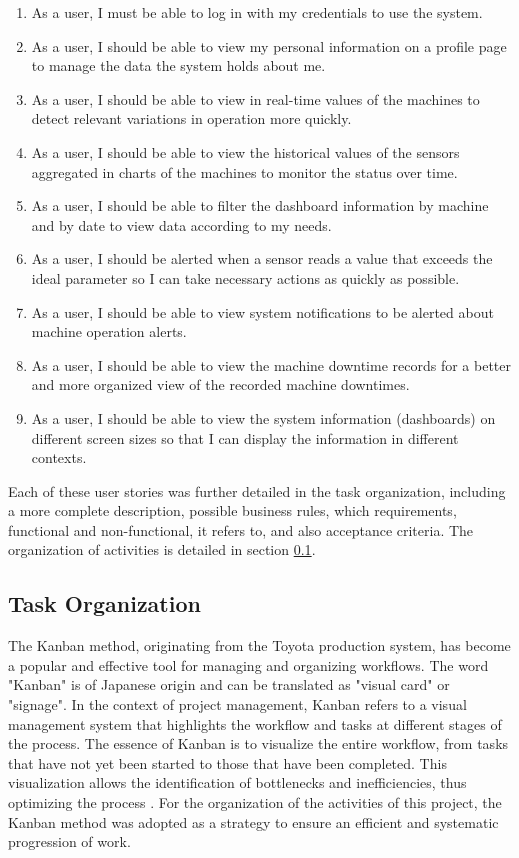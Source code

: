 \begin{enumerate}
    \item As a user, I must be able to log in with my credentials to use the system.
    \item As a user, I should be able to view my personal information on a profile page to manage the data the system holds about me.
    \item As a user, I should be able to view in real-time values of the machines to detect relevant variations in operation more quickly.
    \item As a user, I should be able to view the historical values of the sensors aggregated in charts of the machines to monitor the status over time.
    \item As a user, I should be able to filter the dashboard information by machine and by date to view data according to my needs.
    \item As a user, I should be alerted when a sensor reads a value that exceeds the ideal parameter so I can take necessary actions as quickly as possible.
    \item As a user, I should be able to view system notifications to be alerted about machine operation alerts.
    \item As a user, I should be able to view the machine downtime records for a better and more organized view of the recorded machine downtimes.
    \item As a user, I should be able to view the system information (dashboards) on different screen sizes so that I can display the information in different contexts.
\end{enumerate}

Each of these user stories was further detailed in the task organization, including a more complete description, possible business rules, which requirements, functional and non-functional, it refers to, and also acceptance criteria. The organization of activities is detailed in section \ref{sec:taskOrganization}.


\subsection{Task Organization}\label{sec:taskOrganization}
The Kanban method, originating from the Toyota production system, has become a popular and effective tool for managing and organizing workflows. The word "Kanban" is of Japanese origin and can be translated as "visual card" or "signage". In the context of project management, Kanban refers to a visual management system that highlights the workflow and tasks at different stages of the process. The essence of Kanban is to visualize the entire workflow, from tasks that have not yet been started to those that have been completed. This visualization allows the identification of bottlenecks and inefficiencies, thus optimizing the process \cite{ghani2015agile}. For the organization of the activities of this project, the Kanban method was adopted as a strategy to ensure an efficient and systematic progression of work.

